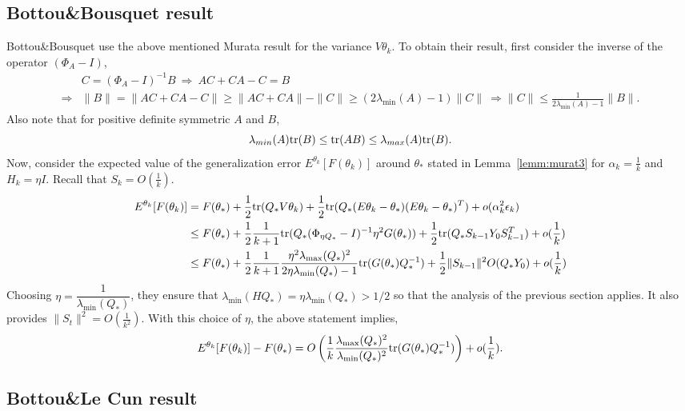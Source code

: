 \documentclass[12pt]{article}
\begin{document}
\bigskip

\subsection{Bottou\&Bousquet result}
Bottou\&Bousquet\cite{Bottou:2007} use the above mentioned Murata result for the variance $V\theta_k$.  To obtain their result, first consider the inverse of the operator $(\Phi_A - I)$,
\begin{align*}
 &C = (\Phi_A-I)^{-1}B \ \Rightarrow \ AC+CA-C = B \\
 \Rightarrow &\|B\| = \|AC+CA-C\| \geq \|AC+CA\|-\|C\| \geq (2\lambda_{\min}(A)-1)\|C\| \ \Rightarrow \|C\| \leq \frac{1}{2\lambda_{\min}(A)-1} \|B\|.
\end{align*}
Also note that for positive definite symmetric $A$ and $B$,
\[
 \lambda_{min}(A)\mbox{tr}(B) \leq \mbox{tr}(AB) \leq \lambda_{max}(A)\mbox{tr}(B).
\]
Now, consider the expected value of the generalization error $E^{\theta_k}[F(\theta_k)]$ around $\theta_\ast$ stated in Lemma~\ref{lemm:murat3} for $\alpha_k = \frac{1}{k}$ and $H_k = \eta I$. Recall that $S_k = O(\frac{1}{k})$.
\begin{align*}
 E^{\theta_k}[F(\theta_k)] &= F(\theta_\ast) + \frac{1}{2}\mbox{tr}(Q_\ast V\theta_k) + \frac{1}{2}\mbox{tr}(Q_\ast(E\theta_k-\theta_\ast)(E\theta_k-\theta_\ast)^T)+o(\alpha_k^2\epsilon_k)\\
 & \leq F(\theta_\ast) + \frac{1}{2}\frac{1}{k+1}\mbox{tr}(Q_\ast(\Phi_{\eta Q_\ast}-I)^{-1} \eta^2 G(\theta_\ast)) + \frac{1}{2}\mbox{tr}(Q_\ast S_{k-1}Y_0 S_{k-1}^T)+o(\frac{1}{k})\\
 & \leq F(\theta_\ast) + \frac{1}{2}\frac{1}{k+1}\frac{\eta^2\lambda_{\max}(Q_\ast)^2 }{2\eta\lambda_{\min}(Q_\ast)-1}\mbox{tr}(G(\theta_\ast)Q_\ast^{-1}) 
 +\frac{1}{2}\|S_{k-1}\|^2O(Q_\ast Y_0) +o(\frac{1}{k})
\end{align*}
Choosing $\eta = \dfrac{1}{\lambda_{\min}(Q_\ast)}$, they ensure that $\lambda_{\min}(HQ_\ast) = \eta \lambda_{\min}(Q_\ast) > 1/2$ so that the analysis of the previous section applies.  It also provides $\|S_t\|^2 = O(\frac{1}{k^{2}})$.  With this choice of $\eta$, the above statement implies,
\[
 E^{\theta_k}[F(\theta_k)] - F(\theta_\ast) = O\left(\frac{1}{k}\frac{\lambda_{\max}(Q_\ast)^2}{\lambda_{\min}(Q_\ast)^2}\mbox{tr}(G(\theta_\ast)Q_\ast^{-1})\right) + o(\frac{1}{k}).
\]

\bigskip

\subsection{Bottou\&Le Cun result}
\end{document}
